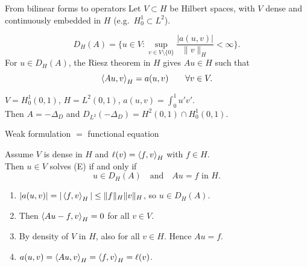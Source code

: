 \begin{frame}{From bilinear forms to operators}
    Let $V \subset H$ be Hilbert spaces, with $V$ dense and continuously embedded in $H$ \mbox{(e.g.\ $H^1_0 \subset L^2$).}
    \begin{definition}
        \[
            D_H(A) = \Big\{ u \in V : \sup_{v \in V\setminus\{0\}} \frac{|a(u,v)|}{\|v\|_H} < \infty \Big\}.
        \]
        For $u \in D_H(A)$, the Riesz theorem in $H$ gives $Au \in H$ such that
        \[
            \left\langle Au, v \right\rangle_H = a(u,v) \qquad \forall v \in V.
        \]
    \end{definition}
    \begin{example}
        $V = H^1_0(0,1)$, $H = L^2(0,1)$, $a(u,v) = \int_0^1 u'v'$.\\ Then $A = -\Delta_D$ and
        $D_{L^2}(-\Delta_D) = H^2(0,1) \cap H^1_0(0,1)$.
    \end{example}
\end{frame}

\begin{frame}{Weak formulation $=$ functional equation}
    \begin{lemma}
        Assume $V$ is dense in $H$ and $\ell(v) = \left\langle f, v \right\rangle_H$ with $f \in H$.\\ Then $u \in V$ solves \textup{(E)} if and only if
        \[
            u \in D_H(A) \quad \text{and} \quad Au = f \text{ in } H.
        \]
    \end{lemma}
    \begin{proofsteps}
        \begin{enumerate}
            \item[$\Rightarrow$] $|a(u,v)| = |\left\langle f, v \right\rangle_H| \le \|f\|_H \|v\|_H$, so $u \in D_H(A)$.
            \item[] Then $\left\langle Au - f, v \right\rangle_H = 0$ for all $v \in V$.
            \item[] By density of $V$ in $H$, also for all $v \in H$. Hence $Au = f$.
            \item[$\Leftarrow$] $a(u,v) = \left\langle Au, v \right\rangle_H = \left\langle f, v \right\rangle_H = \ell(v)$.
        \end{enumerate}
    \end{proofsteps}
\end{frame}

